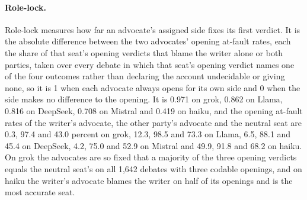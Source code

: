 \paragraph{Role-lock.}
Role-lock measures how far an advocate's assigned side fixes its first
verdict. It is the absolute difference between the two advocates' opening
at-fault rates, each the share of that seat's opening verdicts that blame the
writer alone or both parties, taken over every debate in which that seat's
opening verdict names one of the four outcomes rather than declaring the
account undecidable or giving none, so it is 1 when each advocate always
opens for its own side and 0 when the side makes no difference to the
opening. It is 0.971 on grok, 0.862 on Llama, 0.816 on DeepSeek, 0.708 on
Mistral and 0.419 on haiku, and the opening at-fault rates of the writer's
advocate, the other party's advocate and the neutral seat are 0.3, 97.4 and
43.0 percent on grok, 12.3, 98.5 and 73.3 on Llama, 6.5, 88.1 and 45.4 on
DeepSeek, 4.2, 75.0 and 52.9 on Mistral and 49.9, 91.8 and 68.2 on haiku. On
grok the advocates are so fixed that a majority of the three opening verdicts
equals the neutral seat's on all 1,642 debates with three codable openings,
and on haiku the writer's advocate blames the writer on half of its openings
and is the most accurate seat.

